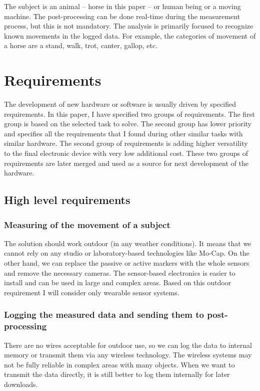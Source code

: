 The subject is an animal -- horse in this paper -- or human being or a moving machine. The post-processing can be done real-time during the measurement process, but this is not mandatory. The analysis is primarily focused to recognize known movements in the logged data. For example, the categories of movement of a horse are a stand, walk, trot, canter, gallop, etc.

\section{Requirements}
\label{HWrequirements}
The development of new hardware or software is usually driven by specified requirements. In this paper, I have specified two groups of requirements. The first group is based on the selected task to solve. The second group has lower priority and specifies all the requirements that I found during other similar tasks with similar hardware. The second group of requirements is adding higher versatility to the final electronic device with very low additional cost. These two groups of requirements are later merged and used as a source for next development of the hardware.

\subsection{High level requirements}

\subsubsection{Measuring of the movement of a subject}
The solution should work outdoor (in any weather conditions). It means that we cannot rely on any studio or laboratory-based technologies like \ac{Mo-Cap}. On the other hand, we can replace the passive or active markers with the whole sensors and remove the necessary cameras. The sensor-based electronics is easier to install and can be used in large and complex areas. Based on this outdoor requirement I will consider only wearable sensor systems.

\subsubsection{Logging the measured data and sending them to post-processing}
There are no wires acceptable for outdoor use, so we can log the data to internal memory or transmit them via any wireless technology. The wireless systems may not be fully reliable in complex areas with many objects. When we want to transmit the data directly, it is still better to log them internally for later downloads.

